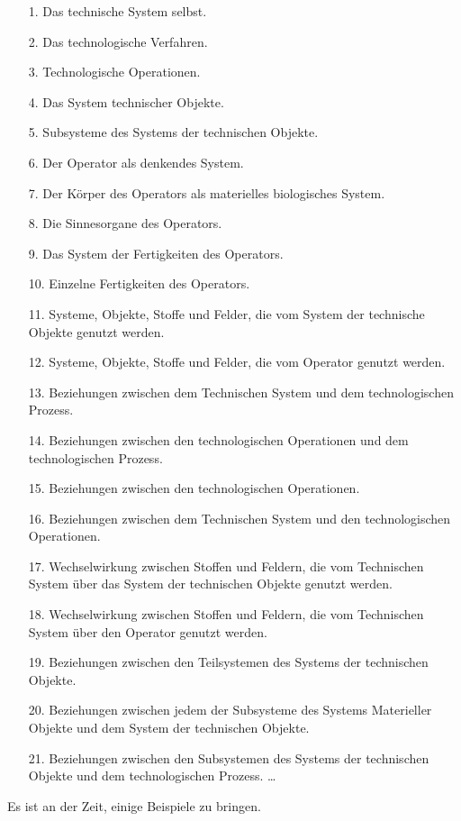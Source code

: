 \documentclass[11pt,a4paper]{article}
\begin{document}
\begin{itemize}[noitemsep]
\item[1.] Das technische System selbst.
\item[2.] Das technologische Verfahren.
\item[3.] Technologische Operationen.
\item[4.] Das System technischer Objekte.
\item[5.] Subsysteme des Systems der technischen Objekte.
\item[6.] Der Operator als denkendes System.
\item[7.] Der Körper des Operators als materielles biologisches System.
\item[8.] Die Sinnesorgane des Operators.
\item[9.] Das System der Fertigkeiten des Operators.
\item[10.] Einzelne Fertigkeiten des Operators.
\item[11.] Systeme, Objekte, Stoffe und Felder, die vom System der technische
  Objekte genutzt werden.
\item[12.] Systeme, Objekte, Stoffe und Felder, die vom Operator genutzt
  werden.
\item[13.] Beziehungen zwischen dem Technischen System und dem technologischen
  Prozess.
\item[14.] Beziehungen zwischen den technologischen Operationen und dem
  technologischen Prozess.
\item[15.] Beziehungen zwischen den technologischen Operationen.
\item[16.] Beziehungen zwischen dem Technischen System und den technologischen
  Operationen.
\item[17.] Wechselwirkung zwischen Stoffen und Feldern, die vom Technischen
  System über das System der technischen Objekte genutzt werden.
\item[18.] Wechselwirkung zwischen Stoffen und Feldern, die vom Technischen
  System über den Operator genutzt werden.
\item[19.] Beziehungen zwischen den Teilsystemen des Systems der technischen
  Objekte.
\item[20.] Beziehungen zwischen jedem der Subsysteme des Systems Materieller
  Objekte und dem System der technischen Objekte.
\item[21.] Beziehungen zwischen den Subsystemen des Systems der technischen
  Objekte und dem technologischen Prozess. \ldots
\end{itemize}
Es ist an der Zeit, einige Beispiele zu bringen. 
\end{document}
